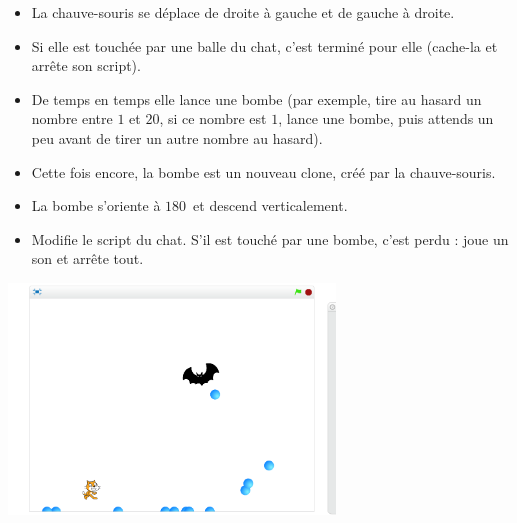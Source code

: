 \documentclass[class=report,crop=false, 12pt]{standalone}
\begin{document}
\begin{activite}

\sauteligne

\begin{itemize}
  \item La chauve-souris se déplace de droite à gauche et de gauche à droite.
  \item Si elle est touchée par une balle du chat, c'est terminé pour elle (cache-la et arrête son script).
  \item De temps en temps elle lance une bombe (par exemple, tire au hasard un nombre entre $1$ et $20$, si ce nombre est $1$, lance une bombe, puis attends un peu avant de tirer un autre nombre au hasard).
  \item Cette fois encore, la bombe est un nouveau clone, créé par la chauve-souris.
  \item La bombe s'oriente à $180$\textdegree\ et descend verticalement.
  \item Modifie le script du chat. S'il est touché par une bombe, c'est perdu : joue un son et arrête tout.
\end{itemize}

\begin{center}
  \includegraphics[width=0.65\textwidth]{ecran-10-ex2} 
\end{center}

  
\end{activite}
\end{document}
